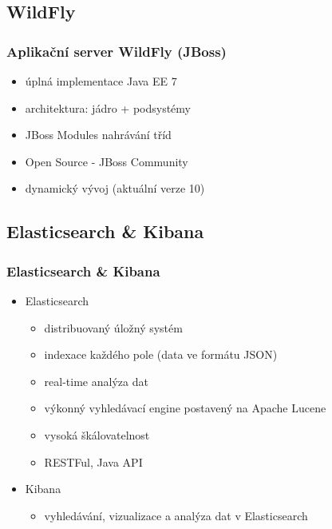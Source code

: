 \documentclass{beamer}
\begin{document}
\subsection{WildFly}
\begin{frame}
	\frametitle{Aplikační server WildFly (JBoss)}
	\begin{itemize}
		\item úplná implementace Java EE 7
		\item architektura: jádro + podsystémy
		\item JBoss Modules nahrávání tříd
		\item Open Source - JBoss Community
		\item dynamický vývoj (aktuální verze 10)
	\end{itemize}
\end{frame}

\subsection{Elasticsearch \& Kibana} %

\begin{frame}
\frametitle{Elasticsearch \& Kibana}
\begin{itemize}
	\item Elasticsearch
	\begin{itemize}
		\item distribuovaný úložný systém
		\item indexace každého pole (data ve formátu JSON)
		\item real-time analýza dat
		\item výkonný vyhledávací engine postavený na Apache Lucene
		\item vysoká škálovatelnost
		\item RESTFul, Java API
	\end{itemize}
	\item Kibana
	\begin{itemize}
		\item vyhledávání, vizualizace a analýza dat v Elasticsearch
	\end{itemize}
\end{itemize}
\end{frame}

\end{document}
